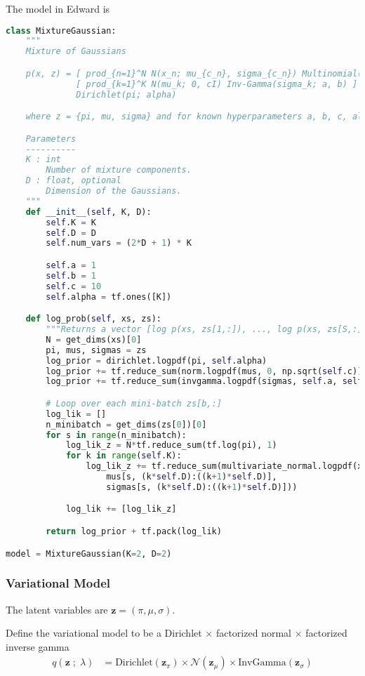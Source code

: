 The model in Edward is
\begin{lstlisting}[language=Python]
class MixtureGaussian:
    """
    Mixture of Gaussians

    p(x, z) = [ prod_{n=1}^N N(x_n; mu_{c_n}, sigma_{c_n}) Multinomial(c_n; pi) ]
              [ prod_{k=1}^K N(mu_k; 0, cI) Inv-Gamma(sigma_k; a, b) ]
              Dirichlet(pi; alpha)

    where z = {pi, mu, sigma} and for known hyperparameters a, b, c, alpha.

    Parameters
    ----------
    K : int
        Number of mixture components.
    D : float, optional
        Dimension of the Gaussians.
    """
    def __init__(self, K, D):
        self.K = K
        self.D = D
        self.num_vars = (2*D + 1) * K

        self.a = 1
        self.b = 1
        self.c = 10
        self.alpha = tf.ones([K])

    def log_prob(self, xs, zs):
        """Returns a vector [log p(xs, zs[1,:]), ..., log p(xs, zs[S,:])]."""
        N = get_dims(xs)[0]
        pi, mus, sigmas = zs
        log_prior = dirichlet.logpdf(pi, self.alpha)
        log_prior += tf.reduce_sum(norm.logpdf(mus, 0, np.sqrt(self.c)), 1)
        log_prior += tf.reduce_sum(invgamma.logpdf(sigmas, self.a, self.b), 1)

        # Loop over each mini-batch zs[b,:]
        log_lik = []
        n_minibatch = get_dims(zs[0])[0]
        for s in range(n_minibatch):
            log_lik_z = N*tf.reduce_sum(tf.log(pi), 1)
            for k in range(self.K):
                log_lik_z += tf.reduce_sum(multivariate_normal.logpdf(xs,
                    mus[s, (k*self.D):((k+1)*self.D)],
                    sigmas[s, (k*self.D):((k+1)*self.D)]))

            log_lik += [log_lik_z]

        return log_prior + tf.pack(log_lik)

model = MixtureGaussian(K=2, D=2)
\end{lstlisting}


\subsubsection{Variational Model}
The latent variables are $\mathbf{z} = (\pi, \mu, \sigma)$.

Define the variational model to be a Dirichlet $\times$ factorized normal
$\times$ factorized inverse gamma
\begin{align*}
  q(\mathbf{z} \;;\; \lambda)
  &=
  \text{Dirichlet}(\mathbf{z}_\pi)
  \times
  \mathcal{N}(\mathbf{z}_\mu)
  \times
  \text{InvGamma}(\mathbf{z}_\sigma)
\end{align*}

